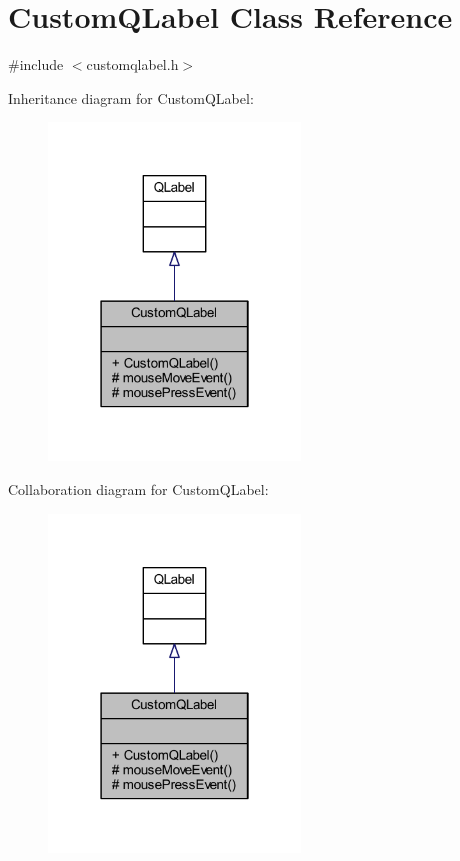\hypertarget{classCustomQLabel}{}\section{Custom\+Q\+Label Class Reference}
\label{classCustomQLabel}


{\ttfamily \#include $<$customqlabel.\+h$>$}



Inheritance diagram for Custom\+Q\+Label\+:
\nopagebreak
\begin{figure}[H]
\begin{center}
\leavevmode
\includegraphics[width=190pt]{classCustomQLabel__inherit__graph}
\end{center}
\end{figure}


Collaboration diagram for Custom\+Q\+Label\+:
\nopagebreak
\begin{figure}[H]
\begin{center}
\leavevmode
\includegraphics[width=190pt]{classCustomQLabel__coll__graph}
\end{center}
\end{figure}
